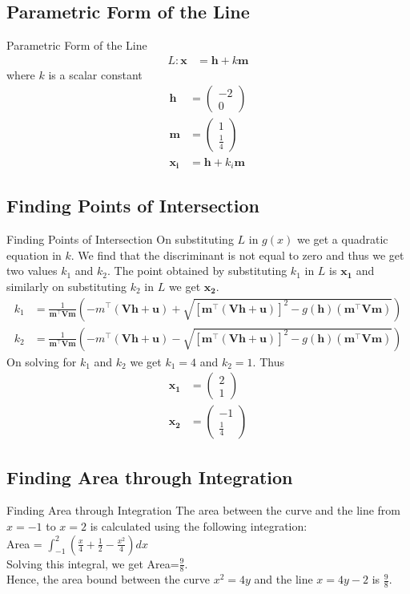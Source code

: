 \documentclass{beamer}
\providecommand{\brak}[1]{\ensuremath{\left(#1\right)}}
\theoremstyle{remark}
\newcommand{\myvec}[1]{\ensuremath{\begin{pmatrix}#1\end{pmatrix}}}
\let\vec\mathbf
\numberwithin{equation}{section}
\begin{document}
\subsection{Parametric Form of the Line}
\begin{frame}{Parametric Form of the Line}
	\begin{align}
	L: \vec{x} &= \vec{h}+k\vec{m} 
 \end{align}
 where $k$ is a scalar constant\\
 \begin{align}
        \vec{h} &= \myvec{-2 \\ 0}\\
	\vec{m} &= \myvec{1 \\ \frac{1}{4}}\\
	\vec{x_i} &= \vec{h}+k_{i}\vec{m}
 \end{align}
\end{frame}

\subsection{Finding Points of Intersection}
\begin{frame}{Finding Points of Intersection}
On substituting $L$ in $g(x)$ we get a quadratic equation in $k$. We find that the discriminant is not equal to zero and thus we get two values $k_1$ and $k_2$.
The point obtained by substituting $k_1$ in $L$ is $\vec{x_1}$ and similarly on substituting $k_2$ in $L$ we get $\vec{x_2}$.
\begin{align}
	k_1 &= \frac{1}{\vec{m}^\top \vec{V}\vec{m}}\brak{-m^\top\brak{\vec{V}\vec{h}+\vec{u}}+ \sqrt{[\vec{m}^\top \brak{\vec{V}\vec{h}+\vec{u}}]^2 - g(\vec{h})\brak{\vec{m}^\top\vec{V}\vec{m}}}} \\
	k_2 &= \frac{1}{\vec{m}^\top \vec{V}\vec{m}}\brak{-m^\top\brak{\vec{V}\vec{h}+\vec{u}}- \sqrt{[\vec{m}^\top \brak{\vec{V}\vec{h}+\vec{u}}]^2 - g(\vec{h})\brak{\vec{m}^\top\vec{V}\vec{m}}}}
\end{align}
On solving for $k_1$ and $k_2$ we get $k_1=4$ and $k_2=1$. Thus
\begin{align}
    \vec{x_1} &= \myvec{2\\1}\\
    \vec{x_2} &= \myvec{-1\\ \frac{1}{4}}
\end{align}
\end{frame}

\subsection{Finding Area through Integration}
\begin{frame}{Finding Area through Integration}
    The area between the curve and the line from $x=-1$ to $x=2$ is calculated using the following integration:\\
    Area = $\int_{-1}^{2}\brak{\frac{x}{4}+\frac{1}{2}-\frac{x^2}{4}}dx$\\
    Solving this integral, we get Area=$\frac{9}{8}$.\\
    Hence, the area bound between the curve $x^2=4y$ and the line $x=4y-2$ is $\frac{9}{8}$.
\end{frame}
\end{document}
